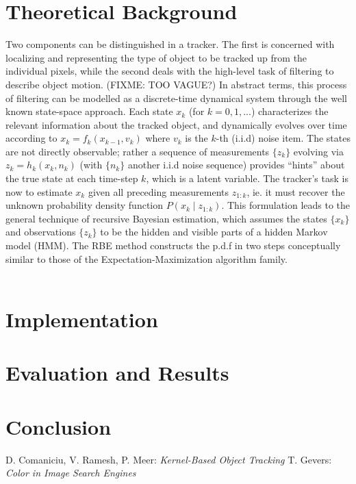 \documentclass[a4paper,11pt]{article}
\begin{document}
	\section*{Theoretical Background}
		Two components can be distinguished in a tracker. The first is concerned
		with localizing and representing the type of object to be tracked up from
		the individual pixels, while the second deals with the high-level task of
		filtering to describe object motion. (FIXME: TOO VAGUE?) In abstract terms,
		this process of filtering can be modelled as a discrete-time dynamical system
		through the well known state-space approach. Each state $x_k$ (for $k=0, 1, ...$)
		characterizes the relevant information about the tracked object, and dynamically
		evolves over time according to $x_k = f_k(x_{k - 1}, v_k)$ where $v_k$ is the
		$k$-th (i.i.d) noise item. The states are not directly observable; rather a
		sequence of measurements $\{z_k\}$ evolving via $z_k = h_k(x_k, n_k)$ (with
		$\{n_k\}$ another i.i.d noise sequence) provides ``hints'' about the true
		state at each time-step $k$, which is a latent variable. The tracker's task
		is now to estimate $x_k$ given all preceding measurements $z_{1:k}$, ie. it
		must recover the unknown probability density function $P(x_k \mid z_{1:k})$.
		This formulation leads to the general technique of recursive Bayesian estimation,
		which assumes the states $\{x_k\}$ and observations $\{z_k\}$ to be the hidden
		and visible parts of a hidden Markov model (HMM). The RBE method constructs the
		p.d.f in two steps conceptually similar to those of the Expectation-Maximization
		algorithm family.
		\\ \\

	\section*{Implementation}

	\section*{Evaluation and Results}

	\section*{Conclusion}

	\begin{thebibliography}{2}
			D. Comaniciu, V. Ramesh, P. Meer: \textit{Kernel-Based Object Tracking}
			T. Gevers: \textit{Color in Image Search Engines}
	\end{thebibliography}
\end{document}
